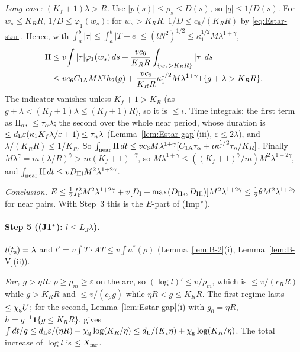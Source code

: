 \emph{Long case: $(K_f+1)\lambda>R$.} Use $|p(s)|\le\rho_s\le D(s)$, so $|q|\le1/D(s)$. For $w_s\le K_RR$, $1/D\le\varphi_1(w_s)$; for
$w_s>K_RR$, $1/D\le c_6/(K_RR)$ by \eqref{eq:Estar-star}. Hence, with $\int_a^b|\tau|\le\int_a^b|T-e|\le(lN^2)^{1/2}\le\kappa_1^{1/2}
M\lambda^{1+\gamma}$,
\begin{align*}
\mathrm{II}&\le v\!\int|\tau|\varphi_1(w_s)\,ds+\frac{vc_6}{K_RR}\int_{\{w_s>K_RR\}}|\tau|\,ds\\
&\le vc_6C_{1\mathrm A} M\lambda^\gamma h_2(g)+\frac{vc_6}{K_RR}\kappa_1^{1/2}M\lambda^{1+\gamma}\mathbf 1\{g+\lambda>K_RR\}.
\end{align*}
The indicator vanishes unless $K_f+1>K_R$ (as $g+\lambda<(K_f+1)\lambda\le(K_f+1)R$), so it is $\le\iota$. Time integrals: the first
term as $\mathrm{II}_\alpha$, $\le\tau_\alpha\lambda$; the second over the whole near period, whose duration is
$\le d_{\mathrm L}\varepsilon(\kappa_1K_f\lambda/\varepsilon+1)\le\tau_n\lambda$ (Lemma~\ref{lem:Estar-gap}(iii), $\varepsilon\le2\lambda$), and
$\lambda/(K_RR)\le1/K_R$. So $\int_{\mathrm{near}}\mathrm{II}\,dt\le vc_6M\lambda^{1+\gamma}[C_{1\mathrm A}\tau_\alpha+\iota\kappa_1^{1/2}\tau_n/K_R]$.
Finally $M\lambda^\gamma=m(\lambda/R)^\gamma>m(K_f+1)^{-\gamma}$, so $M\lambda^{1+\gamma}\le((K_f+1)^\gamma/m)M^2\lambda^{1+2\gamma}$, and
$\int_{\mathrm{near}}\mathrm{II}\,dt\le vD_{\mathrm{IIl}} M^2\lambda^{1+2\gamma}$.

\emph{Conclusion.} $E\le\frac12f_{\mathrm F}^2M^2\lambda^{1+2\gamma}+v[D_{\mathrm I}+\max(D_{\mathrm{IIs}},D_{\mathrm{IIl}})]M^2\lambda^{1+2\gamma}
\le\frac12\bar\theta M^2\lambda^{1+2\gamma}$ for near pairs. With Step~3 this is the $E$-part of (Imp$^{*}$).

\paragraph{Step 5 ((J1$^{*}$): $l\le L_J\lambda$).}
$l(t_{\mathrm s})=\lambda$ and $l'=v\int T\cdot AT\le v\int a^*(\rho)$ (Lemma~\ref{lem:B-2}(i), Lemma~\ref{lem:B-V}(ii)).

\emph{Far, $g>\eta R$:} $\rho\ge\rho_m\ge\varepsilon$ on the arc, so $(\log l)'\le v/\rho_m$, which is $\le v/(c_RR)$ while
$g>K_RR$ and $\le v/(c_\rho g)$ while $\eta R<g\le K_RR$. The first regime lasts $\le\chi_{\mathrm g} U$; for the second,
Lemma~\ref{lem:Estar-gap}(i) with $g_0=\eta R$, $h=g^{-1}\mathbf 1\{g\le K_RR\}$, gives
$\int dt/g\le d_{\mathrm L}\varepsilon/(\eta R)+\chi_{\mathrm g}\log(K_R/\eta)\le d_{\mathrm L}/(K_\varepsilon\eta)+\chi_{\mathrm g}\log(K_R/\eta)$. The total increase of
$\log l$ is $\le X_{\mathrm{far}}$.

